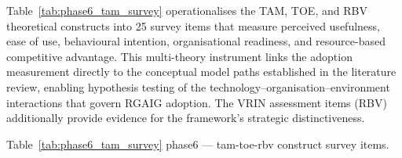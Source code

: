 \vspace{1.5em}

Table~\ref{tab:phase6_tam_survey} operationalises the TAM, TOE, and RBV theoretical constructs into 25 survey items that measure perceived usefulness, ease of use, behavioural intention, organisational readiness, and resource-based competitive advantage. This multi-theory instrument links the adoption measurement directly to the conceptual model paths established in the literature review, enabling hypothesis testing of the technology--organisation--environment interactions that govern RGAIG adoption. The VRIN assessment items (RBV) additionally provide evidence for the framework's strategic distinctiveness.

\begingroup\singlespacing\tablefontsize\tablestripes
\noindent Table~\ref{tab:phase6_tam_survey} phase6 --- tam-toe-rbv construct survey items.

